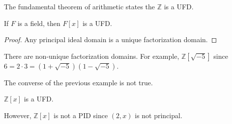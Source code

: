     \begin{example}
        The fundamental theorem of arithmetic states the $\mathbb{Z}$ is a
        UFD.
    \end{example}
    \begin{theorem}
        If $F$ is a field, then $F[x]$ is a UFD.
    \end{theorem}
    \begin{proof}
        Any principal ideal domain is a unique factorization domain.
    \end{proof}
    \begin{example}
        There are non-unique factorization domains. For example,
        $\mathbb{Z}[\sqrt{\minus{5}}]$ since
        $6=2\cdot{3}=(1+\sqrt{\minus{5}})(1-\sqrt{\minus{5}})$.
    \end{example}
    The converse of the previous example is not true.
    \begin{theorem}
        $\mathbb{Z}[x]$ is a UFD.
    \end{theorem}
    However, $\mathbb{Z}[x]$ is not a PID since $(2,x)$ is not principal.
